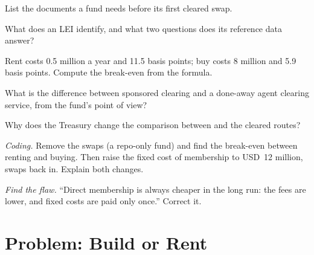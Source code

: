 \begin{exercise}[$\star$]\label{exo:m2:getting-access-rates-credit:2}
List the documents a fund needs before its first cleared swap.
\end{exercise}

\begin{exercise}[$\star$]\label{exo:m2:getting-access-rates-credit:3}
What does an LEI identify, and what two questions does its reference data answer?
\end{exercise}

\begin{exercise}[$\star\star$]\label{exo:m2:getting-access-rates-credit:4}
Rent costs 0.5 million a year and 11.5 basis points; buy costs 8 million and 5.9 basis
points. Compute the break-even from the formula.
\end{exercise}

\begin{exercise}[$\star\star$]\label{exo:m2:getting-access-rates-credit:5}
What is the difference between sponsored clearing and a done-away agent clearing
service, from the fund's point of view?
\end{exercise}

\begin{exercise}[$\star\star$]\label{exo:m2:getting-access-rates-credit:6}
Why does the Treasury  change the comparison between  and
the cleared routes?
\end{exercise}

\begin{exercise}[$\star\star\star$]\label{exo:m2:getting-access-rates-credit:7}
\emph{Coding.} Remove the swaps (a repo-only fund) and find the break-even between
renting and buying. Then raise the fixed cost of membership to USD~12 million, swaps
back in. Explain both changes.
\end{exercise}

\begin{exercise}[$\star\star\star$]\label{exo:m2:getting-access-rates-credit:8}
\emph{Find the flaw.} ``Direct membership is always cheaper in the long run: the fees
are lower, and fixed costs are paid only once.'' Correct it.
\end{exercise}

\section{Problem: Build or Rent}

